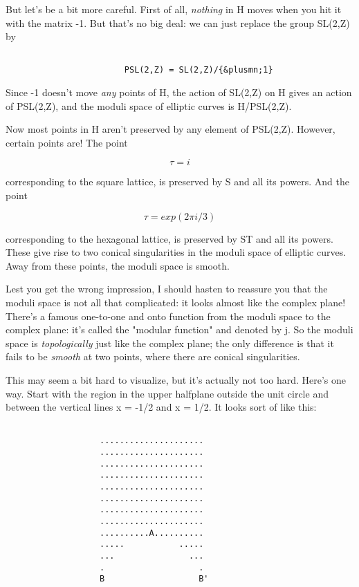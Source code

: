 But let's be a bit more careful.  First of all, \emph{nothing} 
in H moves when 
you hit it with the matrix -1.  But that's no big deal: we can just
replace the group SL(2,Z) by 


\begin{verbatim}

                        PSL(2,Z) = SL(2,Z)/{&plusmn;1}
\end{verbatim}
    
Since -1 doesn't move \emph{any} points of H, the action of SL(2,Z) on H
gives an action of PSL(2,Z), and the moduli space of elliptic curves is
H/PSL(2,Z).  

Now most points in H aren't preserved by any element of PSL(2,Z).  
However, certain points are!  The point 


$$

                            \tau  = i
$$
    
corresponding to the square lattice, is preserved by S and all its
powers.  And the point


$$

                         \tau  = exp(2\pi i/3)
$$
    
corresponding to the hexagonal lattice, is preserved by ST and all its
powers.   These give rise to two conical singularities in the moduli
space of elliptic curves.  Away from these points, the moduli space is
smooth.  

Lest you get the wrong impression, I should hasten to reassure you that
the moduli space is not all that complicated: it looks almost like the
complex plane!  There's a famous one-to-one and onto function from the
moduli space to the complex plane: it's called the "modular function"
and denoted by j.  So the moduli space is \emph{topologically} just like the 
complex plane; the only difference is that it fails to be \emph{smooth} at
two points, where there are conical singularities.  

This may seem a bit hard to visualize, but it's actually not too hard.   
Here's one way.  Start with the region in the upper halfplane outside 
the unit circle and between the vertical lines x = -1/2 and x = 1/2.  
It looks sort of like this:


\begin{verbatim}

                   .....................
                   .....................
                   .....................
                   .....................
                   .....................   
                   .....................
                   .....................               
                   .....................         
                   ..........A..........
                   .....           .....
                   ...               ...
                   .                   .
                   B                   B'

\end{verbatim}
    
